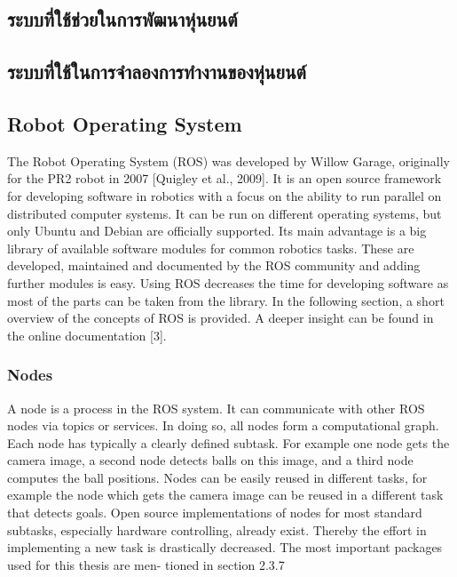 \subsection{ระบบที่ใช้ช่วยในการพัฒนาหุ่นยนต์}

\subsection{ระบบที่ใช้ในการจำลองการทำงานของหุ่นยนต์}



\subsection{Robot Operating System}
The Robot Operating System (ROS) was developed by Willow Garage,  originally
for  the  PR2  robot  in  2007  [Quigley et al., 2009].   It  is  an  open  source  framework
for  developing  software  in  robotics  with  a  focus  on  the  ability  to  run  parallel  on
distributed  computer  systems.   It  can  be  run  on  different  operating  systems,  but
only Ubuntu and Debian are officially supported.  Its main advantage is a big library
of  available  software  modules  for  common  robotics  tasks.   These  are  developed,
maintained and documented by the ROS community and adding further modules is
easy.  Using ROS decreases the time for developing software as most of the parts can
be taken from the library.  In the following section, a short overview of the concepts
of ROS is provided.  A deeper insight can be found in the online documentation [3].

\subsubsection*{Nodes}
A node is a process in the ROS system.  It can communicate with other ROS nodes
via  topics  or  services.   In  doing  so,  all  nodes  form  a  computational  graph.   Each
node has typically a clearly defined subtask.  For example one node gets the camera
image, a second node detects balls on this image, and a third node computes the
ball positions.  Nodes can be easily reused in different tasks, for example the node
which gets the camera image can be reused in a different task that detects goals.
Open  source  implementations  of  nodes  for  most  standard  subtasks,  especially
hardware controlling, already exist.  Thereby the effort in implementing a new task
is drastically decreased.  The most important packages used for this thesis are men-
tioned in section 2.3.7

